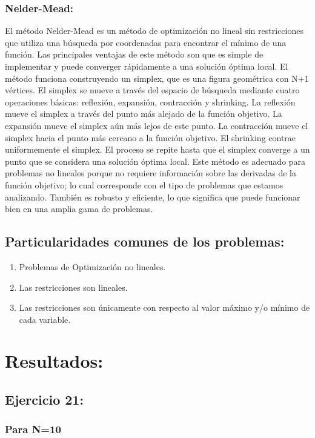 \documentclass{article}
\begin{document}
\subsubsection{Nelder-Mead:}

El método Nelder-Mead es un método de optimización no lineal sin restricciones que utiliza una búsqueda por coordenadas para encontrar el mínimo de una función. Las principales ventajas de este método son que es simple de implementar y puede converger rápidamente a una solución óptima local. El método funciona construyendo un simplex, que es una figura geométrica con N+1 vértices. El simplex se mueve a través del espacio de búsqueda mediante cuatro operaciones básicas: reflexión, expansión, contracción y shrinking. La reflexión mueve el simplex a través del punto más alejado de la función objetivo. La expansión mueve el simplex aún más lejos de este punto. La contracción mueve el simplex hacia el punto más cercano a la función objetivo. El shrinking contrae uniformemente el simplex. El proceso se repite hasta que el simplex converge a un punto que se considera una solución óptima local. Este método es adecuado para problemas no lineales porque no requiere información sobre las derivadas de la función objetivo; lo cual corresponde con el tipo de problemas que estamos analizando. También es robusto y eficiente, lo que significa que puede funcionar bien en una amplia gama de problemas.



\subsection{Particularidades comunes de los problemas:}
\begin{enumerate}
    \item Problemas de Optimización no lineales.
    \item Las restricciones son lineales.
 \item Las restricciones son únicamente con respecto al valor máximo y/o mínimo de cada variable.
\end{enumerate}


\section{Resultados:}
\subsection{Ejercicio 21:}
\subsubsection{Para N=10}
\end{document}
